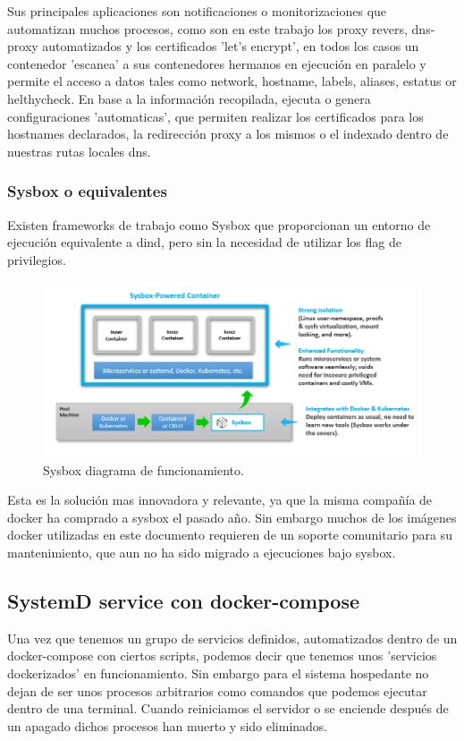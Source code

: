Sus principales aplicaciones son notificaciones o monitorizaciones que automatizan muchos procesos, como son en este trabajo los proxy revers, dns-proxy automatizados y los certificados 'let's encrypt', en todos los casos un contenedor 'escanea' a sus contenedores hermanos en ejecución en paralelo y permite el acceso a datos tales como network, hostname, labels, aliases, estatus or helthycheck. En base a la información recopilada, ejecuta o genera configuraciones 'automaticas', que permiten realizar los certificados para los hostnames declarados, la redirección proxy a los mismos o el indexado dentro de nuestras rutas locales dns.

\subsubsection{Sysbox o equivalentes}
Existen frameworks de trabajo como Sysbox\cite{c_docker_sysbox} que proporcionan un entorno de ejecución equivalente a dind, pero sin la necesidad de utilizar los flag de privilegios.
\clearpage
\begin{figure}[!htb]
\begin{center}
\includegraphics[width=1\textwidth]{./figuras/sysbox-diagram.png}
\caption{Sysbox \cite{c_docker_sysbox} diagrama de funcionamiento.}
\label{F:sysbox-diagram}
\end{center}
\end{figure}
Esta es la solución mas innovadora y relevante, ya que la misma compañía de docker ha comprado a sysbox el pasado año. Sin embargo muchos de los imágenes docker utilizadas en este documento requieren de un soporte comunitario para su mantenimiento, que aun no ha sido migrado a ejecuciones bajo sysbox.

\subsection{SystemD service con docker-compose}\label{S:systemD}
Una vez que tenemos un grupo de servicios definidos, automatizados dentro de un docker-compose con ciertos scripts, podemos decir que tenemos unos 'servicios dockerizados' en funcionamiento. Sin embargo para el sistema hospedante no dejan de ser unos procesos arbitrarios como comandos que podemos ejecutar dentro de una terminal. Cuando reiniciamos el servidor o se enciende después de un apagado dichos procesos han muerto y sido eliminados.

